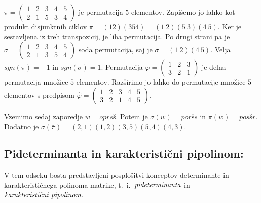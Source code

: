 \documentclass[mat1]{fmfdelo}
\newcommand{\pojem}[1]{\ensuremath{\emph{#1}}}
\begin{document}
\begin{zgled}
$\pi = \begin{pmatrix}
	1 & 2 & 3 & 4 & 5 \\
	2 & 1 & 5 & 3 & 4
\end{pmatrix}$ je permutacija $5$ elementov. Zapišemo jo lahko kot produkt disjunktnih ciklov $\pi = (1 2)(3 5 4) = (1~2)(5~3)(4~5)$. Ker je sestavljena iz treh transpozicij, je liha permutacija. Po drugi strani pa je $\sigma = \begin{pmatrix}
1 & 2 & 3 & 4 & 5 \\
2 & 1 & 3 & 5 & 4
\end{pmatrix}$ soda permutacija, saj je $\sigma = (1~2)(4~5)$. Velja $sgn(\pi) = -1$ in $sgn(\sigma) = 1$. Permutacija $\varphi = \begin{pmatrix}
1 & 2 & 3 \\
3 & 2 & 1
\end{pmatrix}$ je delna permutacija množice $5$ elementov. Razširimo jo lahko do permutacije množice $5$ elementov s predpisom $\hat{\varphi} = \begin{pmatrix}
1 & 2 & 3 & 4 & 5 \\
3 & 2 & 1 & 4 & 5
\end{pmatrix}$.

Vzemimo sedaj zaporedje $w = oprsš$. Potem je $\sigma(w) = poršs$ in $\pi(w) = posšr$. Dodatno je $\sigma(\bar{\pi}) = (2, 1)(1, 2)(3, 5)(5, 4)(4, 3)$.
\end{zgled}

\subsection{Pideterminanta in karakteristični pipolinom:}\label{subsect:pidetinpipoly}
V tem odseku bosta predstavljeni posplošitvi konceptov determinante in karakterističnega polinoma matrike, t.~i.~\pojem{pideterminanta} in \pojem{karakteristični pipolinom}.
\end{document}
